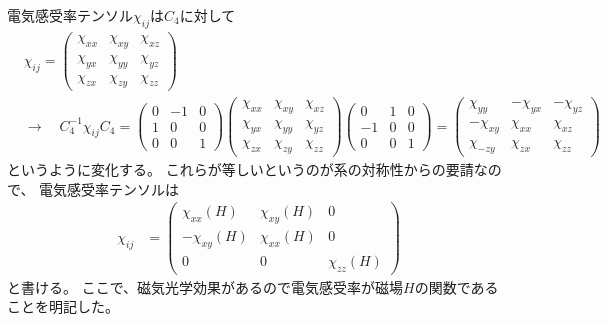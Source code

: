 \documentclass[9pt,dvipdfmx,a4paper]{jsarticle}
\begin{document}
電気感受率テンソル\(\chi_{ij}\)は\(C_4\)に対して
\begin{align}
    &\chi_{ij}
    = \begin{pmatrix}
        \chi_{xx} & \chi_{xy} & \chi_{xz}\\
        \chi_{yx} & \chi_{yy} & \chi_{yz}\\
        \chi_{zx} & \chi_{zy} & \chi_{zz}
    \end{pmatrix}\\
    &\rightarrow\quad
    C_4^{-1}\chi_{ij}C_4
    = \begin{pmatrix}
        0 & -1 & 0\\
        1 & 0 & 0\\
        0 & 0 & 1
    \end{pmatrix}
    \begin{pmatrix}
        \chi_{xx} & \chi_{xy} & \chi_{xz}\\
        \chi_{yx} & \chi_{yy} & \chi_{yz}\\
        \chi_{zx} & \chi_{zy} & \chi_{zz}
    \end{pmatrix}
    \begin{pmatrix}
        0 & 1 & 0\\
        -1 & 0 & 0\\
        0 & 0 & 1
    \end{pmatrix}
    = \begin{pmatrix}
        \chi_{yy} & -\chi_{yx} & -\chi_{yz}\\
        -\chi_{xy} & \chi_{xx} & \chi_{xz}\\
        \chi_{-zy} & \chi_{zx} & \chi_{zz}
    \end{pmatrix}
\end{align}
というように変化する。
これらが等しいというのが系の対称性からの要請なので、
電気感受率テンソルは
\begin{align}
    \chi_{ij}
    &= \begin{pmatrix}
        \chi_{xx}(H) & \chi_{xy}(H) & 0\\
        -\chi_{xy}(H) & \chi_{xx}(H) & 0\\
        0 & 0 & \chi_{zz}(H)
    \end{pmatrix}
\end{align}
と書ける。
ここで、磁気光学効果があるので電気感受率が磁場\(H\)の関数であることを明記した。
\end{document}
